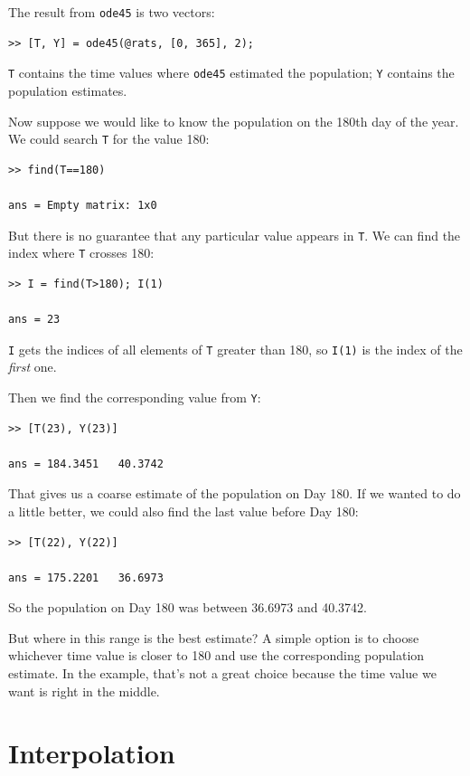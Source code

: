 \documentclass[
]{book}
\begin{document}
The result from {\tt ode45} is two vectors:

\begin{verbatim}
>> [T, Y] = ode45(@rats, [0, 365], 2);
\end{verbatim}

{\tt T} contains the time values where {\tt ode45} estimated the
population; {\tt Y} contains the population estimates.

Now suppose we would like to know the population on the 180th day
of the year.  We could search {\tt T} for the value 180:

\begin{verbatim}
>> find(T==180)

ans = Empty matrix: 1x0
\end{verbatim}

But there is no guarantee that any particular value appears in
{\tt T}.  We can find the index where {\tt T} crosses 180:

\begin{verbatim}
>> I = find(T>180); I(1)

ans = 23
\end{verbatim}

{\tt I} gets the indices of all elements of {\tt T} greater
than 180, so {\tt I(1)} is the index of the {\em first} one.

Then we find the corresponding value from {\tt Y}:

\begin{verbatim}
>> [T(23), Y(23)]

ans = 184.3451   40.3742
\end{verbatim}

That gives us a coarse estimate of the population on Day 180.
If we wanted to do a little better, we could also find the last value
before Day 180:

\begin{verbatim}
>> [T(22), Y(22)]

ans = 175.2201   36.6973
\end{verbatim}

So the population on Day 180 was between 36.6973 and 40.3742.

But where in this range is the best estimate?  A simple option is to
choose whichever time value is closer to 180 and use the corresponding
population estimate.  In the example, that's not a great choice
because the time value we want is right in the middle.


\section{Interpolation}
\end{document}
